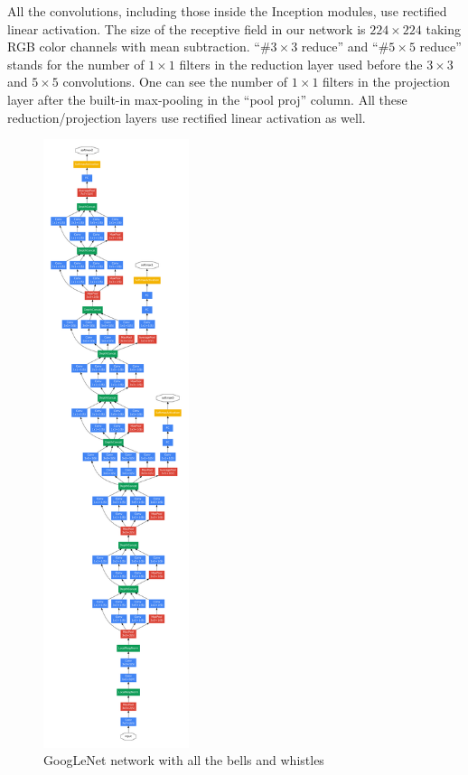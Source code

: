 All the convolutions, including those inside the Inception modules, use rectified linear activation. The size of the receptive field in our network is $224{\times}224$ taking RGB color channels with mean subtraction. ``$\#3{\times}3$ reduce'' and ``$\#5{\times}5$ reduce'' stands for the number of $1{\times}1$ filters in the reduction layer used before the $3{\times}3$ and $5{\times}5$ convolutions. One can see the number of $1{\times}1$ filters in the projection layer after the built-in max-pooling in the “pool proj” column. All these reduction/projection layers use rectified linear activation as well.

\begin{figure}
\centering
\includegraphics[width=0.38\textwidth]{inceptionoverall.pdf}
\caption{GoogLeNet network with all the bells and whistles}
\label{fig:googlenet}
\end{figure}

